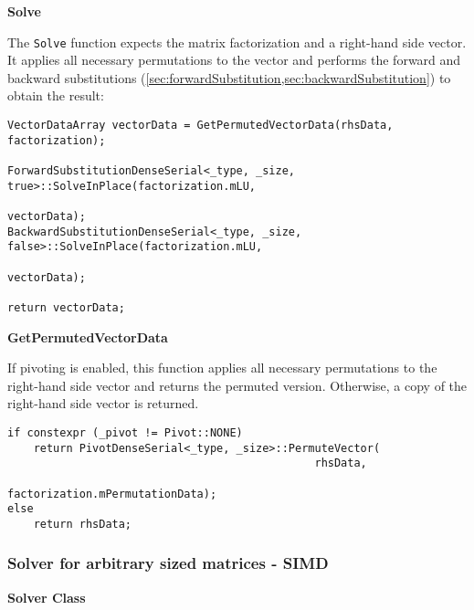 \vspace{1cm}
\textbf{Solve}
\vspace{0.5cm}

The \texttt{Solve} function expects the matrix factorization and a right-hand side vector.
It applies all necessary permutations to the vector and performs the forward and backward substitutions (\cref{sec:forwardSubstitution,sec:backwardSubstitution}) to obtain the result:

\begin{verbatim}
VectorDataArray vectorData = GetPermutedVectorData(rhsData, factorization);

ForwardSubstitutionDenseSerial<_type, _size, true>::SolveInPlace(factorization.mLU, 
                                                                 vectorData);
BackwardSubstitutionDenseSerial<_type, _size, false>::SolveInPlace(factorization.mLU, 
                                                                   vectorData);

return vectorData;
\end{verbatim}




\vspace{1cm}
\textbf{GetPermutedVectorData}
\vspace{0.5cm}

If pivoting is enabled, this function applies all necessary permutations to the right-hand side vector and returns the permuted version.
Otherwise, a copy of the right-hand side vector is returned.

\begin{verbatim}
if constexpr (_pivot != Pivot::NONE)
    return PivotDenseSerial<_type, _size>::PermuteVector(
                                               rhsData, 
                                               factorization.mPermutationData);
else
    return rhsData;
\end{verbatim}







\newpage
\subsubsection{Solver for arbitrary sized matrices - SIMD}

\vspace{0.5cm}
\textbf{Solver Class}
\vspace{0.5cm}

